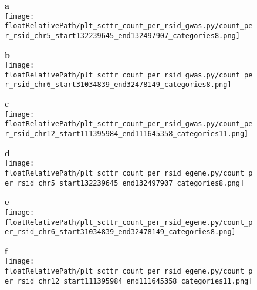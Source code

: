 \begin{figure*}[!ht]

\begin{subfigure}[]{.33\textwidth}
\textbf{a}
\\
\texttt{[image: \\floatRelativePath/plt\_scttr\_count\_per\_rsid\_gwas.py/count\_per\_rsid\_chr5\_start132239645\_end132497907\_categories8.png]}
\end{subfigure}
%
\begin{subfigure}[]{.33\textwidth}
\textbf{b}
\\
\texttt{[image: \\floatRelativePath/plt\_scttr\_count\_per\_rsid\_gwas.py/count\_per\_rsid\_chr6\_start31034839\_end32478149\_categories8.png]}
\end{subfigure}
%
\begin{subfigure}[]{.33\textwidth}
\textbf{c}
\\
\texttt{[image: \\floatRelativePath/plt\_scttr\_count\_per\_rsid\_gwas.py/count\_per\_rsid\_chr12\_start111395984\_end111645358\_categories11.png]}
\end{subfigure}

\begin{subfigure}[]{.33\textwidth}
\textbf{d}
\\
\texttt{[image: \\floatRelativePath/plt\_scttr\_count\_per\_rsid\_egene.py/count\_per\_rsid\_chr5\_start132239645\_end132497907\_categories8.png]}
\end{subfigure}
%
\begin{subfigure}[]{.33\textwidth}
\textbf{e}
\\
\texttt{[image: \\floatRelativePath/plt\_scttr\_count\_per\_rsid\_egene.py/count\_per\_rsid\_chr6\_start31034839\_end32478149\_categories8.png]}
\end{subfigure}
%
\begin{subfigure}[]{.33\textwidth}
\textbf{f}
\\
\texttt{[image: \\floatRelativePath/plt\_scttr\_count\_per\_rsid\_egene.py/count\_per\_rsid\_chr12\_start111395984\_end111645358\_categories11.png]}
\end{subfigure}


\end{figure*}
